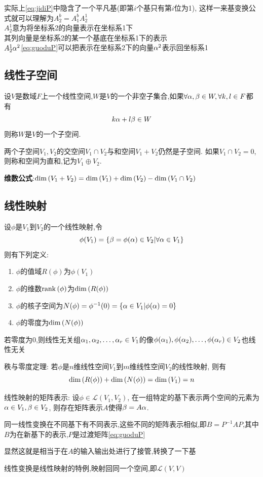 \documentclass{matrix-review}
\makeatletter
\newcommand{\term}[1]{\textbf{#1}\index{A#1@#1}}
\makeatother
\begin{document}
\begin{remarkbox}
    实际上\eqref{eq:jidiP}中隐含了一个平凡基(即第$i$个基只有第$i$位为1), 这样一来基变换公式就可以理解为$A^b_2=A^b_1A^1_2$
    \\[0.9em]
    $A^1_2$意为将坐标系2的向量表示在坐标系1下\\
    其列向量是坐标系2的某一个基底在坐标系1下的表示\\
    $A^1_2\alpha^2$\eqref{eq:guoduP}可以把表示在坐标系2下的向量$\alpha^2$表示回坐标系1
\end{remarkbox}

\subsection{线性子空间}
设$V$是数域$F$上一个线性空间,$W$是$V$的一个非空子集合,如果$\forall \alpha,\beta\in W,\forall k,l\in F$都有$$k\alpha+l\beta\in W$$则称$W$是$V$的一个子空间.

两个子空间$V_1,V_2$的交空间$V_1\cap V_2$与和空间$V_1+V_2$仍然是子空间. 如果$V_1\cap V_2={0}$,则称和空间为直和,记为$V_1\oplus V_2$.

\term{\important 维数公式}:$\mathrm{dim}\left(V_1+V_2\right)=\mathrm{dim}\left(V_1\right)+\mathrm{dim}\left(V_2\right)-\mathrm{dim}\left(V_1\cap V_2\right)$

\subsection{线性映射}
设$\phi$是$V_1$到$V_2$的一个线性映射,令$$\phi(V_1)=\{\beta = \phi(\alpha)\in V_2 | \forall \alpha \in V_1\}$$则有下列定义:
\begin{enumerate}
    \item $\phi$的值域$R(\phi)$为$\phi(V_1)$
    \item $\phi$的维数$\mathrm{rank}\left(\phi\right)$为$\mathrm{dim}\left(R(\phi)\right)$
    \item $\phi$的核子空间为$N(\phi)=\phi^{-1}(0)=\left\{\alpha\in V_1 | \phi(\alpha)=0\right\}$
    \item $\phi$的零度为$\mathrm{dim}\left(N(\phi)\right)$
\end{enumerate}
\begin{remarkbox}
    若零度为0,则线性无关组$\alpha_1,\alpha_2,\dots,\alpha_r\in V_1$的像$\phi(\alpha_1),\phi(\alpha_2),\dots,\phi(\alpha_r)\in V_2$也线性无关
\end{remarkbox}

秩与零度定理: 若$\phi$是$n$维线性空间$V_1$到$m$维线性空间$V_2$的线性映射, 则有$$\mathrm{dim}\left(R(\phi)\right)+\mathrm{dim}\left(N(\phi)\right)=\mathrm{dim}\left(V_1\right)=n$$

线性映射的矩阵表示: 设$\phi\in\mathcal{L}(V_1,V_2)$, 在一组特定的基下表示两个空间的元素为$\alpha\in V_1,\beta\in V_2$, 则存在矩阵表示$A$使得$\beta=A\alpha$.
\begin{remarkbox}
    同一线性变换在不同基下有不同表示,这些不同的矩阵表示相似,即$B=P^{-1}AP$,其中$B$为在新基下的表示,$P$是过渡矩阵\eqref{eq:guoduP}

    显然这就是相当于在$A$的输入输出处进行了接管,转换了一下基
    \begin{remarkbox}
        线性变换是线性映射的特例,映射回同一个空间,即$\mathcal{L}(V,V)$
    \end{remarkbox}
\end{remarkbox}
\end{document}
